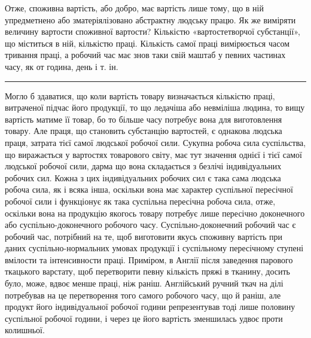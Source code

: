 Отже, споживна вартість, або добро, має вартість лише тому,
що в ній упредметнено або зматеріялізовано абстрактну людську
працю. Як же виміряти величину вартости споживної вартости?
Кількістю «вартостетворчої субстанції», що міститься в ній,
кількістю праці. Кількість самої праці вимірюється часом тривання
праці, а робочий час має знов таки свій маштаб у певних
частинах часу, як от година, день і т. ін.

\pfbreak

Могло б здаватися, що коли вартість товару визначається
кількістю праці, витраченої підчас його продукції, то що ледачіша
або невміліша людина, то вищу вартість матиме її товар,
бо то більше часу потребує вона для виготовлення товару. Але
праця, що становить субстанцію вартостей, є однакова людська
праця, затрата тієї самої людської робочої сили. Сукупна робоча
сила суспільства, що виражається у вартостях товарового світу,
має тут значення однієї і тієї самої людської робочої сили, дарма
що вона складається з безлічі індивідуальних робочих сил. Кожна
з цих індивідуальних робочих сил є така сама людська робоча
сила, як і всяка інша, оскільки вона має характер суспільної
пересічної робочої сили і функціонує як така суспільна пересічна
робоча сила, отже, оскільки вона на продукцію якогось товару
потребує лише пересічно доконечного або суспільно-доконечного
робочого часу. Суспільно-доконечний робочий час є робочий
час, потрібний на те, щоб виготовити якусь споживну вартість
при даних суспільно-нормальних умовах продукції і суспільному
пересічному ступені вмілости та інтенсивности праці. Приміром,
в Англії після заведення парового ткацького варстату,
щоб перетворити певну кількість пряжі в тканину, досить було,
може, вдвоє менше праці, ніж раніш. Англійський ручний ткач
на ділі потребував на це перетворення того самого робочого часу,
що й раніш, але продукт його індивідуальної робочої години
репрезентував тоді лише половину суспільної робочої години, і
через це його вартість зменшилась удвоє проти колишньої.

